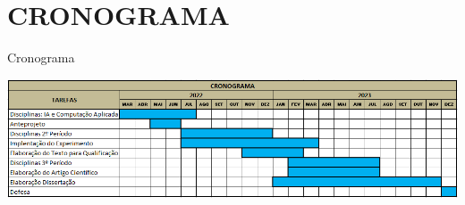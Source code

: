 \chapter[CRONOGRAMA]{CRONOGRAMA}

\begin{table}[!ht]
    \label{fig:cronograma_1}
    \centering
    \caption{Cronograma}
    \centering    
    \includegraphics[width=160mm]{images/cronograma.png}
\end{table}

